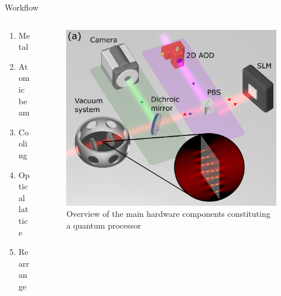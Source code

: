 \documentclass{beamer}
\begin{document}
\begin{frame}{Workflow}
    \begin{columns}
        \begin{column}{.3\textwidth}
            \begin{enumerate}
                \item Metal
                \item Atomic beam
                \item Cooling
                \item Optical lattice
                \item Rearrange
            \end{enumerate}
        \end{column}
        \begin{column}{.7\textwidth}
            \begin{figure}
                \includegraphics[width=.9\textwidth]{images/image.png}
                \caption{Overview of the main hardware components constituting a quantum processor}
            \end{figure}
        \end{column}
    \end{columns}
\end{frame}
\end{document}
